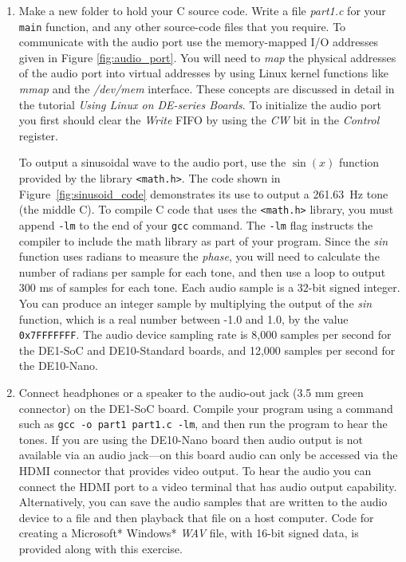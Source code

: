 \documentclass[epsfig,10pt,fullpage]{article}
\begin{document}
\begin{enumerate}
\item Make a new folder to hold your C source code. Write a file {\it part1.c} for your
\texttt{main} function, and any other source-code files that you require. To communicate
with the audio port use the memory-mapped I/O addresses given in Figure \ref{fig:audio_port}.
You will need to {\it map} the physical addresses of the audio port into virtual addresses
by using Linux kernel functions like {\it mmap} and the {\it /dev/mem} interface.
These concepts are discussed in detail in the tutorial {\it Using Linux on DE-series Boards}.
To initialize the audio port you first should clear the {\it Write} FIFO by using the {\it CW} 
bit in the {\it Control} register. 

To output a sinusoidal wave to the audio port, use the $\sin(x)$ function provided by the
library \texttt{<math.h>}. The code shown in Figure~\ref{fig:sinusoid_code}
demonstrates its use to output a 261.63~Hz tone (the middle C). To compile
C code that uses the \texttt{<math.h>} library, you must append \texttt{-lm} to the end of your
\texttt{gcc} command. The \texttt{-lm} flag instructs the compiler to include the math library
as part of your program. Since the {\it sin} function uses radians to measure the {\it phase},
you will need to calculate the number of radians per sample for each tone, and then use a
loop to output 300 ms of samples for each tone. Each audio sample is a 32-bit signed integer. 
You can produce an integer sample by multiplying the output of the {\it sin} function, 
which is a real number between -1.0 and 1.0, by the value \texttt{0x7FFFFFFF}. The audio
device sampling rate is 8,000 samples per second for the DE1-SoC and DE10-Standard boards,
and 12,000 samples per second for the DE10-Nano.
\item Connect headphones or a speaker to the audio-out jack (3.5 mm green connector) on the
DE1-SoC board. Compile your program using a command such as \texttt{gcc -o part1 part1.c -lm}, 
and then run the program to hear the tones. If you are using the DE10-Nano board then
audio output is not available via an audio jack---on this board audio can only be accessed via 
the HDMI connector that provides video output. To hear the audio you can connect the HDMI port 
to a video terminal that has audio output capability. Alternatively, you can save the
audio samples that are written to the audio device to a file and then playback that file
on a host computer. Code for creating a Microsoft* Windows* {\it WAV} file, with 16-bit signed
data, is provided along with this exercise.
\end{enumerate}
\end{document}
